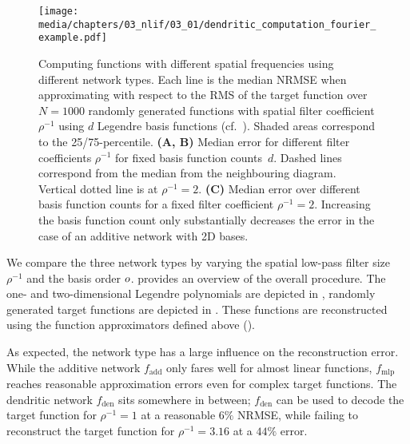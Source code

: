 \begin{figure}
	\texttt{[image: media/chapters/03\_nlif/03\_01/dendritic\_computation\_fourier\_example.pdf]}%
	{\label{fig:dendritic_computation_fourier_example_a}}%
	{\label{fig:dendritic_computation_fourier_example_b}}%
	{\label{fig:dendritic_computation_fourier_example_c}}%
	\caption[Computing functions with different spatial frequencies using different network types]{
	Computing functions with different spatial frequencies using different network types.
	Each line is the median NRMSE when approximating with respect to the RMS of the target function over $N = 1000$ randomly generated functions with spatial filter coefficient $\rho^{-1}$ using $d$ Legendre basis functions (cf.~).
	Shaded areas correspond to the 25/75-percentile.
	\textbf{(A, B)}
	Median error for different filter coefficients $\rho^{-1}$ for fixed basis function counts~$d$. Dashed lines correspond from the median from the neighbouring diagram. Vertical dotted line is at $\rho^{-1} = 2$.
	\textbf{(C)}
	Median error over different basis function counts for a fixed filter coefficient $\rho^{-1} = 2$.
	Increasing the basis function count only substantially decreases the error in the case of an additive network with 2D bases.
	}
	\label{fig:dendritic_computation_fourier_example}
\end{figure}

We compare the three network types by varying the spatial low-pass filter size $\rho^{-1}$ and the basis order $o$.
 provides an overview of the overall procedure.
The one- and two-dimensional Legendre polynomials are depicted in , randomly generated target functions are depicted in .
These functions are reconstructed using the function approximators defined above ().

As expected, the network type has a large influence on the reconstruction error.
While the additive network $f_\mathrm{add}$ only fares well for almost linear functions, $f_\mathrm{mlp}$ reaches reasonable approximation errors even for complex target functions.
The dendritic network $f_\mathrm{den}$ sits somewhere in between;
$f_\mathrm{den}$ can be used to decode the target function for $\rho^{-1} = 1$ at a reasonable $6\%$ NRMSE, while failing to reconstruct the target function for $\rho^{-1} = 3.16$ at a $44\%$ error.

